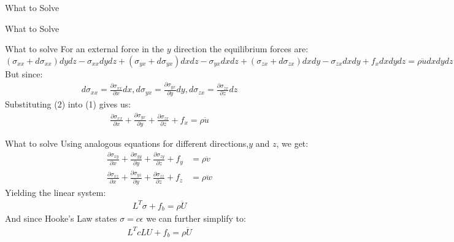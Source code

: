 \documentclass{beamer}
\begin{document}
\begin{section}{What to Solve}
\begin{frame}{What to Solve}
\end{frame}
\begin{frame}{What to solve}
    For an external force in the $y$ direction the equilibrium forces are:
    \begin{dmath}
        (\sigma_{xx}+d\sigma_{xx})dydz - \sigma_{xx}dydz + (\sigma_{yx}+d\sigma_{yx}) dxdz - \sigma_{yx}dxdz + (\sigma_{zx}+d\sigma_{zx})dxdy - \sigma_{zx}dxdy + f_x dx dy dz = \rho \ddot{u} dx dy dz
    \end{dmath}
    But since:
    \begin{align}
        d\sigma_{xx} = \frac{\partial \sigma_{xx}}{\partial x}dx , d\sigma_{yx} = \frac{\partial \sigma_{yx}}{\partial y}dy, d\sigma_{zx} = \frac{\partial \sigma_{zx}}{\partial z} dz
    \end{align}
    Substituting (2) into (1) gives us:
    \begin{align}
        \frac{\partial \sigma_{xx}}{\partial x} + \frac{\partial \sigma_{yx}}{\partial y} + \frac{\partial \sigma_{zx}}{\partial z} + f_x = \rho \ddot{u}
    \end{align}

\end{frame}
\begin{frame}{What to solve}
    Using analogous equations for different directions,$y$ and $z$, we get:
    \begin{align*}
        \frac{\partial \sigma_{xy}}{\partial x} + \frac{\partial \sigma_{yy}}{\partial y} + \frac{\partial \sigma_{zy}}{\partial z} + f_y &= \rho \ddot{v} \\
        \frac{\partial \sigma_{xz}}{\partial x} + \frac{\partial \sigma_{yz}}{\partial y} + \frac{\partial \sigma_{zz}}{\partial z} + f_z &= \rho \ddot{w}
    \end{align*}
    Yielding the linear system:
    \begin{align}
        L^T\sigma + f_b = \rho \ddot{U}
    \end{align}
    And since Hooke's Law states $\sigma = c \epsilon$ we can further simplify to:
    \begin{align*}
        L^TcLU + f_b = \rho \ddot{U}
    \end{align*}
\end{frame}

\end{section}
\end{document}
